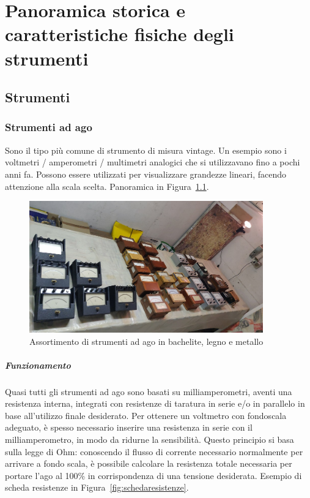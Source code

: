 \documentclass[12pt,a4paper]{report}
\begin{document}
\chapter{Panoramica storica e caratteristiche fisiche degli strumenti}

\section{Strumenti}
\subsection{Strumenti ad ago}
Sono il tipo più comune di strumento di misura vintage. Un esempio sono i voltmetri / amperometri / multimetri analogici che si utilizzavano
fino a pochi anni fa. Possono essere utilizzati per visualizzare grandezze lineari, facendo attenzione alla scala scelta.
Panoramica in Figura~\ref{fig:strumentiago}.
\begin{figure}[h]
  \centering
  \includegraphics[width=0.9\textwidth]{strumentiago}
  \caption{Assortimento di strumenti ad ago in bachelite, legno e metallo}
  \label{fig:strumentiago}
\end{figure}

\paragraph{Funzionamento}
Quasi tutti gli strumenti ad ago sono basati su milliamperometri, aventi una resistenza interna, integrati con resistenze di taratura
in serie e/o in parallelo in base all'utilizzo finale desiderato. Per ottenere un voltmetro con fondoscala adeguato, è spesso necessario
inserire una resistenza in serie con il milliamperometro, in modo da ridurne la sensibilità.
Questo principio si basa sulla legge di Ohm: conoscendo il flusso di corrente necessario normalmente per arrivare a fondo scala, è
possibile calcolare la resistenza totale necessaria per portare l'ago al 100\% in corrispondenza di una tensione desiderata.
Esempio di scheda resistenze in Figura~\ref{fig:schedaresistenze}.
\end{document}
